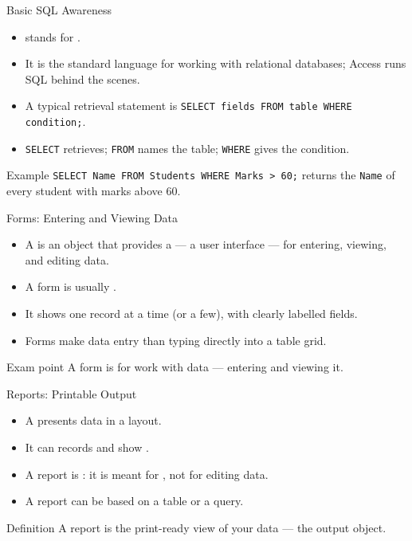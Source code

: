 \documentclass[aspectratio=169]{beamer}
\begin{document}
\begin{frame}{Basic SQL Awareness}
  \begin{itemize}
    \item {} stands for .
    \item It is the standard language for working with relational databases;
      Access runs SQL behind the scenes.
    \item A typical retrieval statement is
      \texttt{SELECT fields FROM table WHERE condition;}.
    \item \texttt{SELECT} retrieves; \texttt{FROM} names the table;
      \texttt{WHERE} gives the condition.
  \end{itemize}
  \begin{exampleblock}{Example}
    \texttt{SELECT Name FROM Students WHERE Marks > 60;} returns the
    \texttt{Name} of every student with marks above 60.
  \end{exampleblock}
\end{frame}

\begin{frame}{Forms: Entering and Viewing Data}
  \begin{itemize}
    \item A  is an object that provides a  --- a user
      interface --- for entering, viewing, and editing data.
    \item A form is usually .
    \item It shows one record at a time (or a few), with clearly labelled
      fields.
    \item Forms make data entry  than typing directly
      into a table grid.
  \end{itemize}
  \begin{alertblock}{Exam point}
    A form is for  work with data --- entering and viewing it.
  \end{alertblock}
\end{frame}

\begin{frame}{Reports: Printable Output}
  \begin{itemize}
    \item A  presents data in a 
      layout.
    \item It can  records and show .
    \item A report is : it is meant for , not for editing data.
    \item A report can be based on a table or a query.
  \end{itemize}
  \begin{block}{Definition}
    A report is the print-ready view of your data --- the output object.
  \end{block}
\end{frame}
\end{document}
